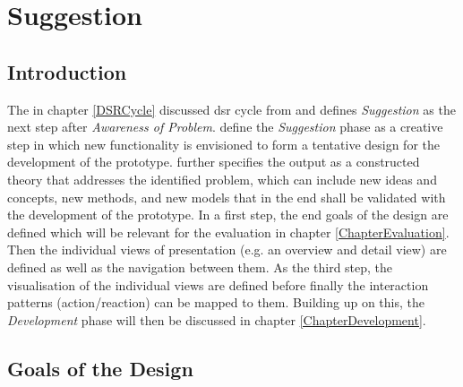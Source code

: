 
\chapter{Suggestion}

\label{ChapterSuggestion}


\section{Introduction}

The in chapter \ref{DSRCycle} discussed \gls{dsr} cycle from \cite{Vaishnavi2008} and \cite{Hevner2010} defines \textit{Suggestion} as the next step after \textit{Awareness of Problem}. \cite{Vaishnavi2008} define the \textit{Suggestion} phase as a creative step in which new functionality is envisioned to form a tentative design for the development of the prototype. \cite{Vaishnavi2008} further specifies the output as a constructed theory that addresses the identified problem, which can include new ideas and concepts, new methods, and new models that in the end shall be validated with the development of the prototype. \newline
In a first step, the end goals of the design are defined which will be relevant for the evaluation in chapter \ref{ChapterEvaluation}. Then the individual views of presentation (e.g. an overview and detail view) are defined as well as the navigation between them. As the third step, the visualisation of the individual views are defined before finally the interaction patterns (action/reaction) can be mapped to them. Building up on this, the \textit{Development} phase will then be discussed in chapter \ref{ChapterDevelopment}.



\section{Goals of the Design}

